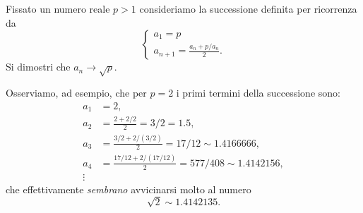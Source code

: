 \documentclass[italian,a4paper]{scrartcl}
\begin{document}
\begin{exercise}\label{ex_Erone}
  Fissato un numero reale $p>1$ consideriamo la successione definita
  per
ricorrenza da
\[
\begin{cases}
  a_1 = p\\
  a_{n+1} = \frac{a_n + p/a_n}{2}.
\end{cases}
\]
Si dimostri che $a_n \to \sqrt p$.
\end{exercise}
Osserviamo, ad esempio, che per $p=2$ i
primi termini della successione sono:
\begin{align*}
a_1 &= 2, \\
a_2 &= \frac{2+2/2}{2} = 3/2 = 1.5, \\
a_3 &= \frac{3/2 + 2/(3/2)}{2} = 17/12 \sim 1.4166666, \\
a_4 &= \frac{17/12 + 2/(17/12)}{2} = 577 / 408 \sim 1.4142156,\\
\vdots
\end{align*}
che effettivamente \emph{sembrano} avvicinarsi molto al numero
\[
\sqrt 2\sim 1.4142135.
\]
\end{document}

